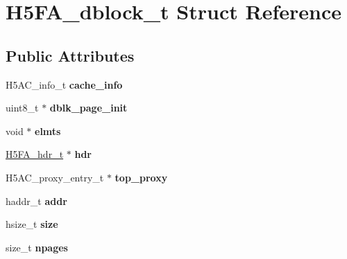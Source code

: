 \hypertarget{struct_h5_f_a__dblock__t}{}\section{H5\+F\+A\+\_\+dblock\+\_\+t Struct Reference}
\label{struct_h5_f_a__dblock__t}
\subsection*{Public Attributes}
\begin{DoxyCompactItemize}
\item 
\mbox{\label{struct_h5_f_a__dblock__t_a04a30cc8920a285d4b6c334dd0be6db2}} 
H5\+A\+C\+\_\+info\+\_\+t {\bfseries cache\+\_\+info}
\item 
\mbox{\label{struct_h5_f_a__dblock__t_a357e67b3953333a8bf129e395843aed2}} 
uint8\+\_\+t $\ast$ {\bfseries dblk\+\_\+page\+\_\+init}
\item 
\mbox{\label{struct_h5_f_a__dblock__t_abbb0e9356edb459ba17a09f2ebe1840a}} 
void $\ast$ {\bfseries elmts}
\item 
\mbox{\label{struct_h5_f_a__dblock__t_ade2854119ae0d77757c2b1202f15e3c0}} 
\hyperlink{struct_h5_f_a__hdr__t}{H5\+F\+A\+\_\+hdr\+\_\+t} $\ast$ {\bfseries hdr}
\item 
\mbox{\label{struct_h5_f_a__dblock__t_a153b54557b4448805265e96045e2fbca}} 
H5\+A\+C\+\_\+proxy\+\_\+entry\+\_\+t $\ast$ {\bfseries top\+\_\+proxy}
\item 
\mbox{\label{struct_h5_f_a__dblock__t_a5b6db92a11d21438ef6731941fd038c5}} 
haddr\+\_\+t {\bfseries addr}
\item 
\mbox{\label{struct_h5_f_a__dblock__t_a4f5cb47da051dfab5556cbb0f2aaa9eb}} 
hsize\+\_\+t {\bfseries size}
\item 
\mbox{\label{struct_h5_f_a__dblock__t_ac586036092a1d4e8da0e25c0d43246ea}} 
size\+\_\+t {\bfseries npages}
\item 
\mbox{\label{struct_h5_f_a__dblock__t_a59c3acf4a7eb63aa908eec74ef98a758}} 

\end{DoxyCompactItemize}
